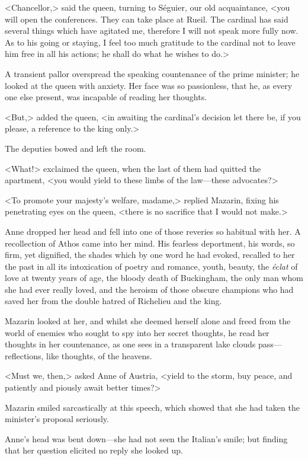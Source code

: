 <Chancellor,> said the queen, turning to Séguier, our old acquaintance, <you will open the conferences. They can take place at Rueil. The cardinal has said several things which have agitated me, therefore I will not speak more fully now. As to his going or staying, I feel too much gratitude to the cardinal not to leave him free in all his actions; he shall do what he wishes to do.>

A transient pallor overspread the speaking countenance of the prime minister; he looked at the queen with anxiety. Her face was so passionless, that he, as every one else present, was incapable of reading her thoughts.

<But,> added the queen, <in awaiting the cardinal's decision let there be, if you please, a reference to the king only.>

The deputies bowed and left the room.

<What!> exclaimed the queen, when the last of them had quitted the apartment, <you would yield to these limbs of the law—these advocates?>

<To promote your majesty's welfare, madame,> replied Mazarin, fixing his penetrating eyes on the queen, <there is no sacrifice that I would not make.>

Anne dropped her head and fell into one of those reveries so habitual with her. A recollection of Athos came into her mind. His fearless deportment, his words, so firm, yet dignified, the shades which by one word he had evoked, recalled to her the past in all its intoxication of poetry and romance, youth, beauty, the \textit{éclat} of love at twenty years of age, the bloody death of Buckingham, the only man whom she had ever really loved, and the heroism of those obscure champions who had saved her from the double hatred of Richelieu and the king.

Mazarin looked at her, and whilst she deemed herself alone and freed from the world of enemies who sought to spy into her secret thoughts, he read her thoughts in her countenance, as one sees in a transparent lake clouds pass—reflections, like thoughts, of the heavens.

<Must we, then,> asked Anne of Austria, <yield to the storm, buy peace, and patiently and piously await better times?>

Mazarin smiled sarcastically at this speech, which showed that she had taken the minister's proposal seriously.

Anne's head was bent down—she had not seen the Italian's smile; but finding that her question elicited no reply she looked up.

